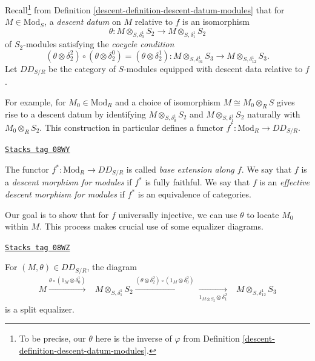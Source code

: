 \medskip\noindent
Recall\footnote{To be precise, our $\theta$ here is the inverse of
$\varphi$ from Definition \ref{descent-definition-descent-datum-modules}.}
from Definition \ref{descent-definition-descent-datum-modules} that for
$M \in \text{Mod}_S$, a {\it descent datum} on $M$ relative to $f$ is
an isomorphism
$$
\theta :
M \otimes_{S,\delta^1_0} S_2
\longrightarrow
M \otimes_{S,\delta^1_1} S_2
$$
of $S_2$-modules satisfying the {\it cocycle condition}
\begin{equation}
\label{equation-cocycle-condition}
(\theta \otimes \delta_2^2) \circ (\theta \otimes \delta_2^0) = (\theta \otimes
\delta_2^1):
M \otimes_{S, \delta^1_{01}} S_3 \to M \otimes_{S,\delta^1_{12}} S_3.
\end{equation}
Let $DD_{S/R}$ be the category of $S$-modules equipped with descent data
relative to $f$.

\medskip\noindent
For example, for $M_0 \in \text{Mod}_R$ and a choice of isomorphism
$M \cong M_0 \otimes_R S$ gives rise to a descent datum by identifying
$M \otimes_{S,\delta^1_0} S_2$ and $M \otimes_{S,\delta^1_1} S_2$
naturally with $M_0 \otimes_R S_2$. This construction in particular
defines a functor $f^*: \text{Mod}_R \to DD_{S/R}$.

\begin{definition}
\label{descent-definition-effective-descent}
\href{https://stacks.math.columbia.edu/tag/08WY}{\texttt{Stacks tag 08WY}}

The functor $f^*: \text{Mod}_R \to DD_{S/R}$
is called {\it base extension along $f$}. We say that $f$ is a
{\it descent morphism for modules} if $f^*$ is fully
faithful. We say that $f$ is an {\it effective descent morphism for modules}
if $f^*$ is an equivalence of categories.
\end{definition}

Our goal is to show that for $f$ universally injective, we can use $\theta$ to
locate $M_0$ within $M$. This process makes crucial use of some equalizer
diagrams.

\begin{lemma}[Equalizer M]
\label{descent-lemma-equalizer-M}
\href{https://stacks.math.columbia.edu/tag/08WZ}{\texttt{Stacks tag 08WZ}}

For $(M,\theta) \in DD_{S/R}$, the diagram
\begin{equation}
\label{equation-equalizer-M}
\begin{array}{ccc}M \overset{\theta \circ (1_M \otimes \delta_0^1)}{\longrightarrow} & M \otimes_{S, \delta_1^1} S_2
\overset{(\theta \otimes \delta_2^2) \circ (1_M \otimes \delta^2_0)}{\longrightarrow}\underset{1_{M \otimes S_2} \otimes \delta^2_1}{\longrightarrow} & M \otimes_{S, \delta_{12}^1} S_3\end{array}
\end{equation}
is a split equalizer.
\end{lemma}

